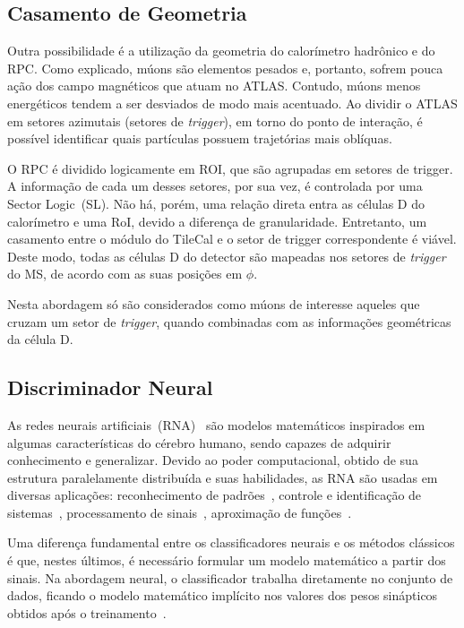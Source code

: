\subsection*{Casamento de Geometria}

Outra possibilidade é a utilização da geometria do calorímetro hadrônico e do
RPC. Como explicado, múons são elementos pesados e, portanto, sofrem pouca ação
dos campo magnéticos que atuam no ATLAS. Contudo, múons menos energéticos tendem
a ser desviados de modo mais acentuado. Ao dividir o ATLAS em setores azimutais
(setores de \emph{trigger}), em torno do ponto de interação, é possível
identificar quais partículas possuem trajetórias mais oblíquas.

O RPC é dividido logicamente em ROI, que são agrupadas em
setores de trigger. A informação de cada um desses setores, por sua vez, é
controlada por uma Sector Logic~(SL). Não há, porém, uma relação direta entra
as células D do calorímetro e uma RoI, devido a diferença de granularidade.
Entretanto, um casamento entre o módulo do TileCal e o setor de trigger
correspondente é viável. Deste modo, todas as células D do detector são
mapeadas nos setores de
\emph{trigger} do MS, de acordo com as suas posições em $\phi$.

Nesta abordagem só são considerados como múons de interesse aqueles que cruzam
um setor de \emph{trigger}, quando combinadas com as informações geométricas da
célula D.



\subsection*{Discriminador Neural}

As redes neurais artificiais~(RNA)~\cite{WASSERMAN1989,HAYKIN2008} são modelos
matemáticos inspirados em algumas características do cérebro humano, sendo
capazes de adquirir conhecimento e generalizar. Devido ao poder computacional,
obtido de sua estrutura paralelamente distribuída e suas habilidades, as RNA
são usadas em diversas aplicações: reconhecimento de padrões~\cite{BISHOP1995},
controle e identificação de sistemas~\cite{ICHIKAWA1992}, processamento de
sinais~\cite{LAPEDES1987}, aproximação de funções~\cite{DENG2011}.

Uma diferença fundamental entre os classificadores neurais e os métodos
clássicos é que, nestes últimos, é necessário formular um modelo matemático a
partir dos sinais. Na abordagem neural, o classificador trabalha diretamente no
conjunto de dados, ficando o modelo matemático implícito nos valores dos pesos
sinápticos obtidos após o treinamento~\cite{ref:SIMAS}.

